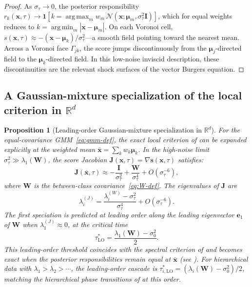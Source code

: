 \documentclass[11pt]{article}
\newtheorem{proposition}[theorem]{Proposition}
\newcommand{\R}{\mathbb{R}}
\DeclareMathOperator*{\argmin}{arg\,min}
\DeclareMathOperator*{\argmax}{arg\,max}
\begin{document}
\begin{proof}
As $\sigma_\tau \to 0$, the posterior responsibility $r_k(\bm{x},\tau) \to \mathbf{1}[k = \argmax_m w_m\,\mathcal{N}(\bm{x};\bm{\mu}_m,\sigma_\tau^2\bm{I})]$, which for equal weights reduces to $k = \argmin_m |\bm{x} - \bm{\mu}_m|$.
On each Voronoi cell, $s(\bm{x},\tau) \approx -(\bm{x} - \bm{\mu}_k)/\sigma_\tau^2$---a smooth field pointing toward the nearest mean.
Across a Voronoi face $\Gamma_{jk}$, the score jumps discontinuously from the $\bm{\mu}_j$-directed field to the $\bm{\mu}_k$-directed field.
In this low-noise inviscid description, these discontinuities are the relevant shock surfaces of the vector Burgers equation.
\end{proof}

\subsection{A Gaussian-mixture specialization of the local criterion in \texorpdfstring{$\R^d$}{Rd}}\label{sec:md:speciation}

\begin{proposition}[Leading-order Gaussian-mixture specialization in $\R^d$]\label{thm:d-speciation}
For the equal-covariance GMM~\eqref{eq:gmm-def}, the exact local criterion of  can be expanded explicitly at the weighted mean $\bar{\bm{x}} = \sum_k w_k \bm{\mu}_k$. In the high-noise limit $\sigma_\tau^2 \gg \lambda_1(\bm{W})$, the score Jacobian $\bm{J}(\bm{x},\tau) = \nabla \bm{s}(\bm{x},\tau)$ satisfies:
\begin{equation}\label{eq:jacobian-high-noise}
  \bm{J}(\bar{\bm{x}},\tau) \approx -\frac{\bm{I}}{\sigma_\tau^2} + \frac{\bm{W}}{\sigma_\tau^4} + O(\sigma_\tau^{-6}),
\end{equation}
where $\bm{W}$ is the between-class covariance~\eqref{eq:W-def}.
The eigenvalues of $\bm{J}$ are
\begin{equation}\label{eq:jacobian-eigs}
  \lambda_i^{(J)} = \frac{\lambda_i^{(W)} - \sigma_\tau^2}{\sigma_\tau^4} + O(\sigma_\tau^{-6}).
\end{equation}
The first speciation is predicted at leading order along the leading eigenvector $\bm{e}_1$ of $\bm{W}$ when $\lambda_1^{(J)} \approx 0$, at the critical time
\begin{equation}\label{eq:tau-star-d}
  \tau^\ast_{\mathrm{LO}} = \frac{\lambda_1(\bm{W}) - \sigma_0^2}{2}.
\end{equation}
This leading-order threshold coincides with the spectral criterion of \citet{biroli2024dynamical} and becomes exact when the posterior responsibilities remain equal at $\bar{\bm{x}}$ (see ).
For hierarchical data with $\lambda_1 > \lambda_2 > \cdots$, the leading-order cascade is $\tau_{i,\mathrm{LO}}^\ast = (\lambda_i(\bm{W}) - \sigma_0^2)/2$, matching the hierarchical phase transitions of \citet{sclocchi2024phase} at this order.
\end{proposition}
\end{document}
